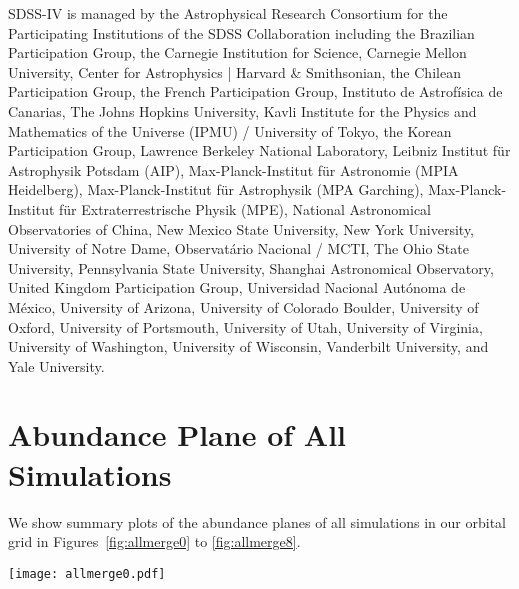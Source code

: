 \documentclass[twocolumn,linenumbers,trackchanges]{aastex631}
\newcommand{\FeH}{\ensuremath{[\textrm{Fe}/\textrm{H}]}}
\newcommand{\MgFe}{\ensuremath{[\textrm{Mg}/\textrm{Fe}]}}
\begin{document}
\begin{acknowledgements}
SDSS-IV is managed by the 
Astrophysical Research Consortium 
for the Participating Institutions 
of the SDSS Collaboration including 
the Brazilian Participation Group, 
the Carnegie Institution for Science, 
Carnegie Mellon University, Center for 
Astrophysics | Harvard \& 
Smithsonian, the Chilean Participation 
Group, the French Participation Group, 
Instituto de Astrof\'isica de 
Canarias, The Johns Hopkins 
University, Kavli Institute for the 
Physics and Mathematics of the 
Universe (IPMU) / University of 
Tokyo, the Korean Participation Group, 
Lawrence Berkeley National Laboratory, 
Leibniz Institut f\"ur Astrophysik 
Potsdam (AIP),  Max-Planck-Institut 
f\"ur Astronomie (MPIA Heidelberg), 
Max-Planck-Institut f\"ur 
Astrophysik (MPA Garching), 
Max-Planck-Institut f\"ur 
Extraterrestrische Physik (MPE), 
National Astronomical Observatories of 
China, New Mexico State University, 
New York University, University of 
Notre Dame, Observat\'ario 
Nacional / MCTI, The Ohio State 
University, Pennsylvania State 
University, Shanghai 
Astronomical Observatory, United 
Kingdom Participation Group, 
Universidad Nacional Aut\'onoma 
de M\'exico, University of Arizona, 
University of Colorado Boulder, 
University of Oxford, University of 
Portsmouth, University of Utah, 
University of Virginia, University 
of Washington, University of 
Wisconsin, Vanderbilt University, 
and Yale University.

\end{acknowledgements}

{}


\appendix
\section{Abundance Plane of All Simulations}\label{app:allmerge}
We show summary plots of the abundance planes of all simulations in our orbital grid in Figures~\ref{fig:allmerge0} to \ref{fig:allmerge8}.

\begin{figure*}
  \centering
  \texttt{[image: allmerge0.pdf]}
  \caption{A summary of the abundance plane and star formation history of all simulations within the orbital grid. Each figure shows the outcome of a simulation at a fixed $R_0$ and $V_0$, varying $\eta$. The title of each column shows the $R_0$, $V_0$, and $\eta$ of that simulation, in order. The upper and middle rows replicate Figure~\ref{fig:fig1}, which show the distribution of stars in the abundance plane of \MgFe{}-\FeH{} as well as 1D histograms at a fixed \FeH{} of $-0.5$, $-0.25$, $0$, and $0.25$. The lower rows replicate Figure~\ref{fig:before_after_sfh_by_iron}, showing the star formation history at each \FeH{}.}
  \label{fig:allmerge0}
\end{figure*}
\end{document}
